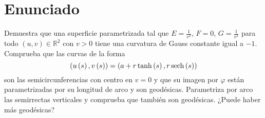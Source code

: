\section{Enunciado}
Demuestra que una superficie parametrizada tal que $E = \frac{1}{v^2}$, $F = 0$,
$G = \frac{1}{v^2}$ para todo $\left( u, v \right) \in \mathbb{R}^2$ con $v > 0$
tiene una curvatura de Gauss constante igual a $-1$. Comprueba que las curvas de
la forma
\[
\left( u\left( s \right), v\left( s \right) \right) = \left( a + r \tanh \left(
s\right), r \operatorname{sech}\left( s \right) \right)
\]
son las semicircunferencias con centro en $v = 0$ y que su imagen por $\varphi$
están parametrizadas por su longitud de arco y son geodésicas. Parametriza por
arco las semirrectas verticales y comprueba que también son geodésicas. ¿Puede
haber más geodésicas?
